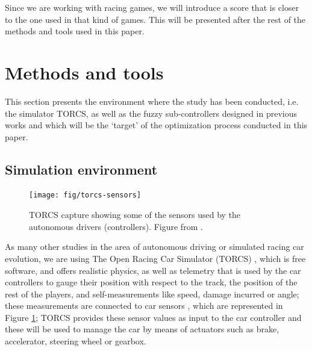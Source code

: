 \documentclass[10pt,journal,compsoc]{IEEEtran}
\begin{document}
Since we are working with racing games, we will introduce a score that
is closer to the one used in that kind of games. This will be
presented after the rest of the methods and tools used in this paper. 



\section{Methods and tools}
\label{sec:methods}

This section presents the environment where the study has been conducted, i.e. the simulator TORCS, as well as the fuzzy sub-controllers designed in previous works and which will be the `target' of the optimization process conducted in this paper. 

%
\subsection{Simulation environment}

\begin{figure}[!ht] 
	\begin{center}
		\texttt{[image: fig/torcs-sensors]}
		\caption {TORCS capture showing some of the sensors
                used by the autonomous drivers (controllers). Figure from \cite{DBLP:conf/cig/SalemMG19}.}
		\label{fig:torcs-sensors}
	\end{center}
\end{figure}

As many other studies in the area of autonomous driving or simulated
racing car evolution, we are using The Open Racing Car Simulator
(TORCS) \cite{torcs4}, which is free software, and offers realistic
physics, as well as telemetry that is used by the car controllers to
gauge their position with respect to the track, the position of the
rest of the players, and self-measurements like speed, damage incurred
or angle; these measurements are connected to car sensors \cite{manualTORCS}, which are represented in Figure \ref{fig:torcs-sensors}; TORCS provides
these sensor values as input to the car controller and these will be
used to manage the car by means of actuators such as brake,
accelerator, steering wheel or gearbox. 

\end{document}
